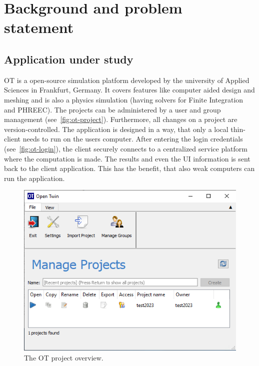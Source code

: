 
\chapter{Background and problem statement} %

\label{chap:background} %


\section{Application under study}
\acf{OT} is a open-source simulation platform developed by the university of Applied Sciences in Frankfurt, Germany. It covers features like computer aided design and meshing and is also a physics simulation (having solvers for Finite Integration and PHREEC). The projects can be administered by a user and group management (see~\autoref{fig:ot-project}). Furthermore, all changes on a project are version-controlled. The application is designed in a way, that only a local thin-client needs to run on the users computer. After entering the login credentials (see~\autoref{fig:ot-login}), the client securely connects to a centralized service platform where the computation is made. The results and even the \ac{UI} information is sent back to the client application. This has the benefit, that also weak computers can run the application.

\begin{figure}[ht]
	\centering
	\includegraphics[width=.9\textwidth]{Figures/ot-project.png}
	\caption{The \ac{OT} project overview.}
	\label{fig:ot-project}
\end{figure}

